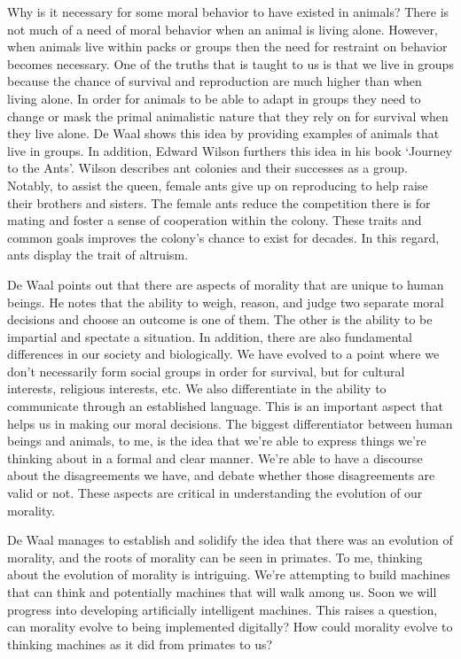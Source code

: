 \documentclass[11pt, oneside]{article}
\begin{document}
\par 
Why is it necessary for some moral behavior to have existed in animals? There is not much of a need of moral behavior when an animal is living alone. However, when animals live within packs or groups then the need for restraint on behavior becomes necessary. 
One of the truths that is taught to us is that we live in groups because the chance of survival and reproduction are much higher than when living alone. In order for animals to be able to adapt in groups they need to change or mask the primal animalistic nature that they rely on for survival when they live alone. De Waal shows this idea by providing examples of animals that live in groups. 
In addition, Edward Wilson furthers this idea in his book `Journey to the Ants'. Wilson describes ant colonies and their successes as a group. Notably, to assist the queen, female ants give up on reproducing to help raise their brothers and sisters. The female ants reduce the competition there is for mating and foster a sense of cooperation within the colony. These traits and common goals improves the colony's chance to exist for decades. In this regard, ants display the trait of altruism. 

\par 
De Waal points out that there are aspects of morality that are unique to human beings. He notes that the ability to weigh, reason, and judge two separate moral decisions and choose an outcome is one of them. The other is the ability to be impartial and spectate a situation. 
In addition, there are also fundamental differences in our society and biologically. We have evolved to a point where we don't necessarily form social groups in order for survival, but for cultural interests, religious interests, etc. We also differentiate in the ability to communicate through an established language. This is an important aspect that helps us in making our moral decisions. 
The biggest differentiator between human beings and animals, to me, is the idea that we're able to express things we're thinking about in a formal and clear manner. We're able to have a discourse about the disagreements we have, and debate whether those disagreements are valid or not. These aspects are critical in understanding the evolution of our morality.

\par 
De Waal manages to establish and solidify the idea that there was an evolution of morality, and the roots of morality can be seen in primates. 
To me, thinking about the evolution of morality is intriguing. We're attempting to build machines that can think and potentially machines that will walk among us. Soon we will progress into developing artificially intelligent machines. 
This raises a question, can morality evolve to being implemented digitally? How could morality evolve to thinking machines as it did from primates to us?
\end{document}
